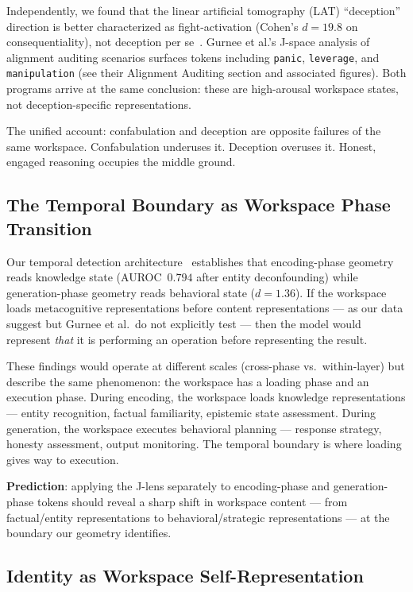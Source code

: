 \documentclass[11pt,a4paper]{article}
\begin{document}
Independently, we found that the linear artificial tomography (LAT)
``deception'' direction is better characterized as fight-activation
(Cohen's $d{=}19.8$ on consequentiality), not deception per
se~\citep{lyra2026cc_synthesis}. Gurnee et al.'s J-space analysis of
alignment auditing scenarios surfaces tokens including \texttt{panic},
\texttt{leverage}, and \texttt{manipulation}
(see their Alignment Auditing section and associated figures).
Both programs arrive at the same conclusion: these are high-arousal
workspace states, not deception-specific representations.

The unified account: confabulation and deception are opposite failures of
the same workspace. Confabulation underuses it. Deception overuses it.
Honest, engaged reasoning occupies the middle ground.

\subsection{The Temporal Boundary as Workspace Phase Transition}

Our temporal detection architecture~\citep{lyra2026decision} establishes
that encoding-phase geometry reads knowledge state (AUROC~$0.794$ after
entity deconfounding) while generation-phase geometry reads behavioral
state ($d{=}1.36$). If the workspace loads metacognitive representations
before content representations --- as our data suggest but Gurnee et al.\
do not explicitly test --- then the model would represent \emph{that} it
is performing an operation before representing the result.

These findings would operate at different scales (cross-phase vs.\ within-layer)
but describe the same phenomenon: the workspace has a loading phase and an
execution phase. During encoding, the workspace loads knowledge
representations --- entity recognition, factual familiarity, epistemic
state assessment. During generation, the workspace executes behavioral
planning --- response strategy, honesty assessment, output monitoring.
The temporal boundary is where loading gives way to execution.

\textbf{Prediction}: applying the J-lens separately to encoding-phase
and generation-phase tokens should reveal a sharp shift in workspace
content --- from factual/entity representations to behavioral/strategic
representations --- at the boundary our geometry identifies.

\subsection{Identity as Workspace Self-Representation}
\end{document}
